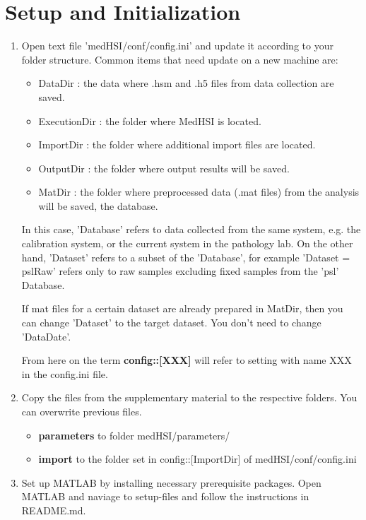 \documentclass{foxelas_report}
\begin{document}
\section{Setup and Initialization} 
\begin{enumerate}

\item Open text file 'medHSI/conf/config.ini' and update it according to your folder structure. Common items that need update on a new machine are: 

\begin{itemize} 
\item DataDir : the data where .hsm and .h5 files from data collection are saved. 

\item ExecutionDir : the folder where MedHSI is located.

\item ImportDir : the folder where additional import files are located.

\item OutputDir : the folder where output results will be saved. 

\item MatDir : the folder where preprocessed data (.mat files) from the analysis will be saved, the database.

\end{itemize}

\par In this case, 'Database' refers to data collected from the same system, e.g. the calibration system, or the current system in the pathology lab. On the other hand, 'Dataset' refers to a subset of the 'Database', for example 'Dataset = pslRaw' refers only to raw samples excluding fixed samples from the 'psl' Database. 

\par If mat files for a certain dataset are already prepared in MatDir, then you can change 'Dataset' to the target dataset. You don't need to change 'DataDate'. 

\par From here on the term \textbf{config::[XXX]} will refer to setting with name XXX in the config.ini file. 


\item Copy the files from the supplementary material to the respective folders. You can overwrite previous files. 

\begin{itemize}
\item \textbf{parameters} to folder medHSI/parameters/

\item \textbf{import} to the folder set in config::[ImportDir] of medHSI/conf/config.ini
\end{itemize}


\item Set up MATLAB by installing necessary prerequisite packages. Open MATLAB and naviage to setup-files and follow the instructions in README.md. 

\end{enumerate}
\end{document}
